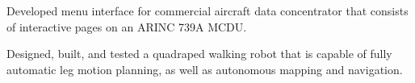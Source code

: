 \documentclass[../Gabriel_Roper_Resume]{subfiles}
\begin{document}

{Developed menu interface for commercial aircraft data concentrator
    that consists of interactive pages on an ARINC 739A MCDU.}


{Designed, built, and tested a quadraped walking robot that
    is capable of fully automatic leg motion planning, as well as autonomous mapping and navigation.}

\end{document}
